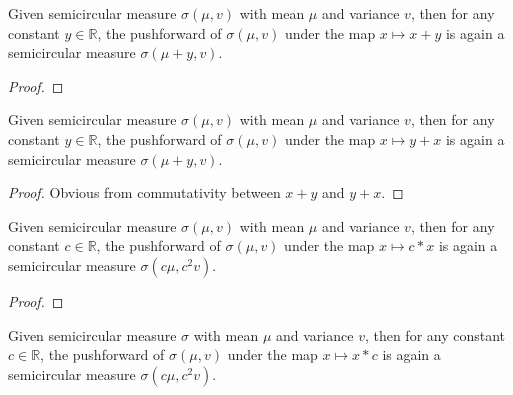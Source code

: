 \begin{lemma}
  \label{lem:semicircleReal_map_add_const}
  \leanok
  Given semicircular measure $\sigma(\mu, v)$ with mean $\mu$ and variance $v$, then for any constant $y \in \mathbb{R}$, the pushforward
  of $\sigma(\mu, v)$ under the map $x \mapsto x + y$ is again a semicircular measure $\sigma(\mu + y, v)$.
\end{lemma}

\begin{proof}
  \leanok
\end{proof}


\begin{lemma}
  \label{lem:semicircleReal_map_const_add}
  \leanok
  Given semicircular measure $\sigma(\mu, v)$ with mean $\mu$ and variance $v$, then for any constant $y \in \mathbb{R}$, the pushforward
  of $\sigma(\mu, v)$ under the map $x \mapsto y + x$ is again a semicircular measure $\sigma(\mu + y, v)$.
\end{lemma}

\begin{proof}
  \leanok
  Obvious from commutativity between $x + y$ and $y + x$.
\end{proof}


\begin{lemma}
  \label{lem:semicircleReal_map_const_mul}
  \leanok
    Given semicircular measure $\sigma(\mu, v)$ with mean $\mu$ and variance $v$, then for any constant $c \in \mathbb{R}$, the pushforward
  of $\sigma(\mu, v)$ under the map $x \mapsto c * x$ is again a semicircular measure $\sigma(c\mu, c^2v)$.
\end{lemma}

\begin{proof}
  \leanok
\end{proof}



\begin{lemma}
  \label{lem:semicircleReal_map_mul_const}
  \leanok
   Given semicircular measure $\sigma$ with mean $\mu$ and variance $v$, then for any constant $c \in \mathbb{R}$, the pushforward
  of $\sigma(\mu, v)$ under the map $x \mapsto x * c$ is again a semicircular measure $\sigma(c\mu, c^2v)$.
\end{lemma}

